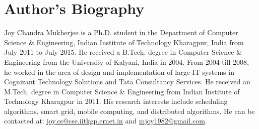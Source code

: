 \chapter*{Author's Biography} 
{\LARGE J}oy Chandra Mukherjee is a Ph.D. student in the Department of Computer Science \& Engineering, Indian Institute of Technology Kharagpur, India from July 2011 to July 2015. He received a B.Tech. degree in Computer Science \& Engineering from the University of Kalyani, India in 2004. From 2004 till 2008, he worked in the area of design and implementation of large IT systems in Cognizant Technology Solutions and Tata Consultancy Services. He received an M.Tech. degree in Computer Science \& Engineering from Indian Institute of Technology Kharagpur in 2011. His research interests include scheduling algorithms, smart grid, mobile computing, and distributed algorithms. He can be contacted at: \url{joy.cs@cse.iitkgp.ernet.in} and \url{mjoy1982@gmail.com}. 


